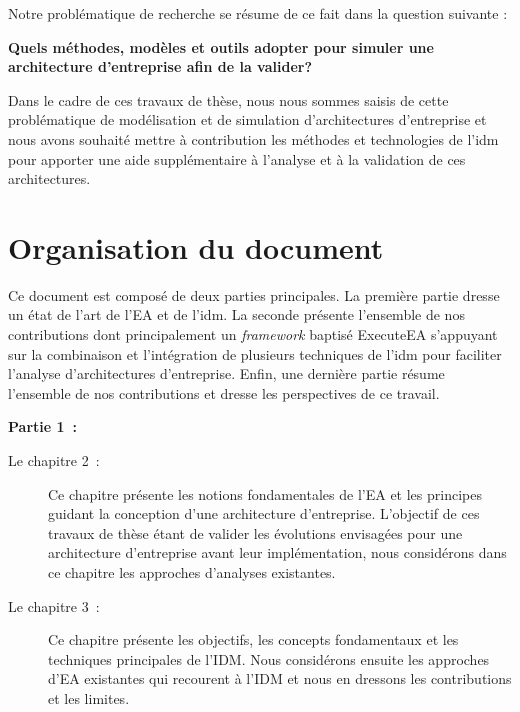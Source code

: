 Notre problématique de recherche se résume de ce fait dans la question suivante :

\vspace*{1em}
\begin{framed}
{\bfseries Quels méthodes, modèles et outils adopter pour simuler une 
architecture d'entreprise afin de la valider?}
\end{framed}

Dans le cadre de ces travaux de thèse, nous nous sommes saisis de cette problématique
de modélisation et de simulation d'architectures d'entreprise et nous avons souhaité mettre à
contribution les méthodes et technologies de l'\gls{idm} pour apporter une aide supplémentaire
à l'analyse et à la validation de ces architectures.


\section{Organisation du document}

Ce document est composé de deux parties principales. La première partie dresse un état de l'art
de l'EA et de l'\gls{idm}. La seconde présente
l'ensemble de nos contributions dont principalement un \emph{framework} baptisé ExecuteEA
s'appuyant sur la combinaison et l'intégration de plusieurs techniques de l'\gls{idm} pour faciliter
l'analyse d'architectures d'entreprise. Enfin, une dernière partie résume l'ensemble de nos contributions
et dresse les perspectives de ce travail. 

\textbf{Partie 1~: }

    \begin{description}

        \item[Le chapitre 2~:  ]  Ce chapitre présente les notions fondamentales de l'EA 
et les principes guidant la conception d'une architecture d'entreprise. L'objectif de ces travaux de thèse étant de valider
les évolutions envisagées pour une architecture d'entreprise avant leur implémentation, nous
considérons dans ce chapitre les approches d'analyses existantes.

        \item[Le chapitre 3~: ] Ce chapitre présente les objectifs, les concepts fondamentaux et les techniques principales de l'IDM. Nous considérons
ensuite les approches d'EA existantes qui recourent à l'IDM et nous en dressons les contributions et les limites. 

    \end{description}


